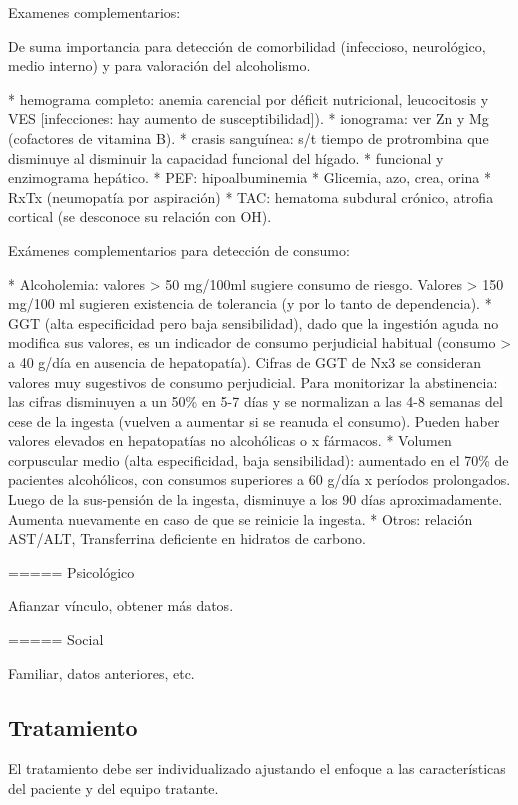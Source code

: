 \documentclass{scrbook}
\begin{document}
Examenes complementarios:

De suma importancia para detección de comorbilidad (infeccioso, neurológico, medio interno) y para valoración del alcoholismo.

* hemograma completo: anemia carencial por déficit nutricional, leucocitosis y VES [infecciones: hay aumento de susceptibilidad]).
* ionograma: ver Zn y Mg (cofactores de vitamina B).
* crasis sanguínea: s/t tiempo de protrombina que disminuye al disminuir la capacidad funcional del hígado.
* funcional y enzimograma hepático.
* PEF: hipoalbuminemia
* Glicemia, azo, crea, orina
* RxTx (neumopatía por aspiración)
* TAC: hematoma subdural crónico, atrofia cortical (se desconoce su relación con OH).

Exámenes complementarios para detección de consumo:

* Alcoholemia: valores > 50 mg/100ml sugiere consumo de riesgo. Valores > 150 mg/100 ml sugieren existencia de tolerancia (y por lo tanto de dependencia).
* GGT (alta especificidad pero baja sensibilidad), dado que la ingestión aguda no modifica sus valores, es un indicador de consumo perjudicial habitual (consumo > a 40 g/día en ausencia de hepatopatía). Cifras de GGT de Nx3 se consideran valores muy sugestivos de consumo perjudicial. Para monitorizar la abstinencia: las cifras disminuyen a un 50\% en 5-7 días y se normalizan a las 4-8 semanas del cese de la ingesta (vuelven a aumentar si se reanuda el consumo). Pueden haber valores elevados en hepatopatías no alcohólicas o x fármacos.
* Volumen corpuscular medio (alta especificidad, baja sensibilidad): aumentado en el 70\% de pacientes alcohólicos, con consumos superiores a 60 g/día x períodos prolongados. Luego de la sus-pensión de la ingesta, disminuye a los 90 días aproximadamente. Aumenta nuevamente en caso de que se reinicie la ingesta.
* Otros: relación AST/ALT, Transferrina deficiente en hidratos de carbono.

===== Psicológico

Afianzar vínculo, obtener más datos.

===== Social

Familiar, datos anteriores, etc.

\subsection*{Tratamiento}

El tratamiento debe ser individualizado ajustando el enfoque a las características del paciente y del equipo tratante.
\end{document}
